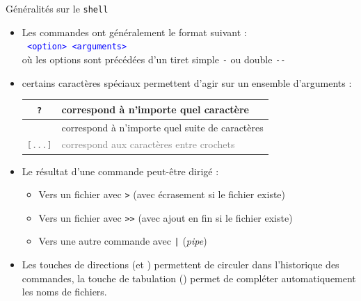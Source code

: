 \documentclass[10pt]{beamer}
\begin{document}
\begin{frame}{\Ctitle}{\stitle}
	\begin{block}{Généralités sur le {\tt shell}}
		\begin{itemize}
			\item<1-> Les commandes ont généralement le format suivant : \\
				\textcolor{blue}{\tt <nom commande> <option> <arguments>} \\
				où les options sont précédées d'un tiret  simple \textcolor{Sepia}{\tt -} ou double \textcolor{Sepia}{\tt -{}-}
			\item<2-> certains caractères spéciaux permettent d'agir sur un ensemble d'arguments : \\
				\begin{tabularx}{0.8\linewidth}{|c|X|}
					\hline
					\textcolor{Sepia}{\tt ?}    & correspond à n'importe quel caractère                      \\
					\hline
					\textcolor{Sepia}{\tt *}    & correspond à n'importe quel suite de caractères            \\
					\hline
					\textcolor{gray}{\tt [...]} & \textcolor{gray}{correspond aux caractères entre crochets} \\
					\hline
				\end{tabularx}
			\item<3-> Le résultat d'une commande peut-être dirigé :
				\begin{itemize}
					\item<4-> Vers un fichier avec \textcolor{Sepia}{\tt >} (avec écrasement si le fichier existe)
					\item<5-> Vers un fichier avec \textcolor{Sepia}{\tt >{}>} (avec ajout en fin si le fichier existe)
					\item<6-> Vers une autre commande avec \textcolor{Sepia}{\tt |} (\textit{pipe})
				\end{itemize}
			\item<7-> Les touches de directions (\UArrow et \DArrow) permettent de circuler dans l'historique des commandes, la touche de tabulation (\Tab) permet de compléter automatiquement les noms de fichiers.

		\end{itemize}
	\end{block}
\end{frame}
\end{document}
